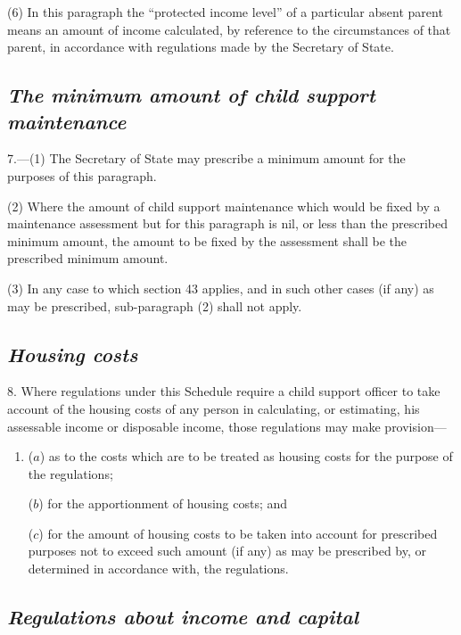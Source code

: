 \documentclass[12pt,a4paper]{article}
\begin{document}
(6) In this paragraph the “protected income level” of a particular absent parent means an amount of income calculated, by reference to the circumstances of that parent, in accordance with regulations made by the Secretary of State.


\subsection*{\itshape The minimum amount of child support maintenance}

7.---(1) The Secretary of State may prescribe a minimum amount for the purposes of this paragraph.

(2) Where the amount of child support maintenance which would be fixed by a maintenance assessment but for this paragraph is nil, or less than the prescribed minimum amount, the amount to be fixed by the assessment shall be the prescribed minimum amount.

(3) In any case to which section 43 applies, and in such other cases (if any) as may be prescribed, sub-paragraph (2)  shall not apply.

\subsection*{\itshape Housing costs}

8. Where regulations under this Schedule require a child support officer to take account of the housing costs of any person in calculating, or estimating, his assessable income or disposable income, those regulations may make provision—
\begin{enumerate}\item[]
($a$) as to the costs which are to be treated as housing costs for the purpose of the regulations;

($b$) for the apportionment of housing costs; and

($c$) for the amount of housing costs to be taken into account for prescribed purposes not to exceed such amount (if any) as may be prescribed by, or determined in accordance with, the regulations.
\end{enumerate}

\subsection*{\itshape Regulations about income and capital}
\end{document}
